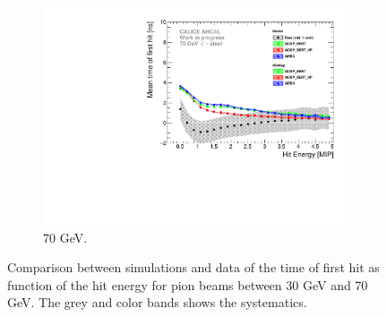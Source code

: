 \begin{figure}[htbp!]
\begin{subfigure}[t]{0.5\textwidth}
    \includegraphics[width=1\textwidth]{../Thesis_Plots/Timing/Pions/Plots/ComparisonToSim/Time_Energy_70GeV.pdf}
    \caption{70 GeV.} \label{fig:Energy_SimData_70GeV}
  \end{subfigure}
  \hfill
  \caption{Comparison between simulations and data of the time of first hit as function of the hit energy for pion beams between 30 GeV and 70 GeV. The grey and color bands shows the systematics.}
\end{figure}

